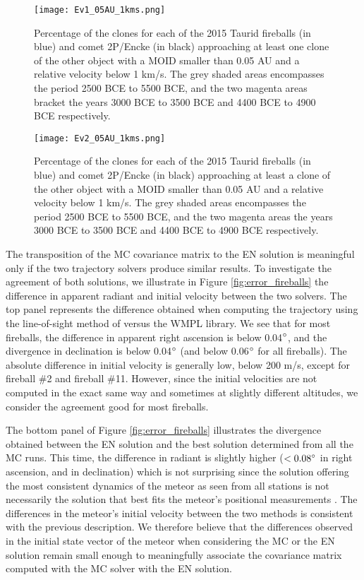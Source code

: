 \documentclass[letters,a4paper,fleqn,usenatbib]{mnras}
\begin{document}
 \begin{figure*}
	\centering
	\texttt{[image: Ev1\_05AU\_1kms.png]}
	\caption{Percentage of the clones for each of the 2015 Taurid fireballs (in blue) and comet 2P/Encke (in black) approaching at least one clone of the other object with a MOID smaller than 0.05 AU and a relative velocity below 1 km/s. The grey shaded areas encompasses the period 2500 BCE to 5500 BCE, and the two magenta areas bracket the years 3000 BCE to 3500 BCE and 4400 BCE to 4900 BCE respectively.}
	\label{fig:fireballs_with_peak}
\end{figure*}

\begin{figure*}
	\centering
	\texttt{[image: Ev2\_05AU\_1kms.png]}
	\caption{Percentage of the clones for each of the 2015 Taurid fireballs (in blue) and comet 2P/Encke (in black) approaching at least a clone of the other object with a MOID smaller than 0.05 AU and a relative velocity below 1 km/s. The grey shaded areas encompasses the period 2500 BCE to 5500 BCE, and the two magenta areas the years 3000 BCE to 3500 BCE and 4400 BCE to 4900 BCE respectively.}
	\label{fig:fireballs_without_peak}
\end{figure*}

The transposition of the MC covariance matrix to the EN solution is meaningful only if the two trajectory solvers produce similar results. To investigate the agreement of both solutions, we illustrate in Figure \ref{fig:error_fireballs} the difference in apparent radiant and initial velocity between the two solvers. The top panel represents the difference obtained when computing the trajectory using the line-of-sight method of \cite{Borovicka1990} versus the WMPL library. We see that for most fireballs, the difference in apparent right ascension is below 0.04$\degree$, and the divergence in declination is below 0.04$\degree$ (and below 0.06$\degree$ for all fireballs). The absolute difference in initial velocity is generally low, below 200 m/s, except for fireball \#2 and fireball \#11. However, since the initial velocities are not computed in the exact same way and sometimes at slightly different altitudes, we consider the agreement good for most fireballs. 

The bottom panel of Figure \ref{fig:error_fireballs} illustrates the divergence obtained between the EN solution and the best solution determined from all the MC runs. This time, the difference in radiant is  slightly higher ($<0.08\degree$ in right ascension, and in declination) which is not surprising since the solution offering the most consistent dynamics of the meteor as seen from all stations is not necessarily the solution that best fits the meteor's positional measurements \citep{Vida2019}. The differences in the meteor's initial velocity between the two methods is consistent with the previous description. We therefore believe that the differences observed in the initial state vector of the meteor when considering the MC or the EN solution remain small enough to meaningfully associate the covariance matrix computed with the MC solver with the EN solution. 
\end{document}
